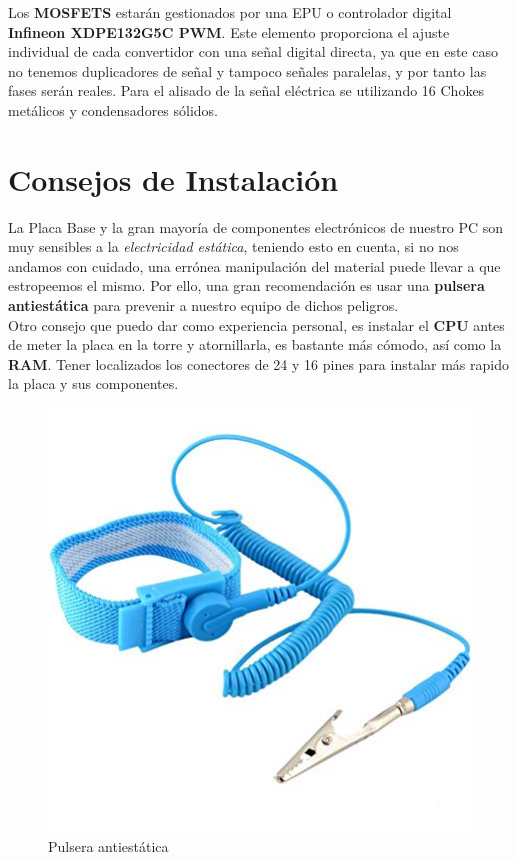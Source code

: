 \documentclass{article}
\begin{document}
      Los \textbf{MOSFETS} estarán gestionados por una EPU o controlador digital \textbf{Infineon XDPE132G5C PWM}. Este elemento proporciona el ajuste individual de cada convertidor con una señal digital directa, ya que en este caso no tenemos 
      duplicadores de señal y tampoco señales paralelas, y por tanto las fases serán reales. Para el alisado de la señal eléctrica se utilizando 16 Chokes metálicos y condensadores sólidos. 

  
      \section{Consejos de Instalación}
        La Placa Base y la gran mayoría de componentes electrónicos de nuestro PC son muy sensibles a la \textit{electricidad estática}, teniendo esto en cuenta, si no nos andamos con cuidado, una errónea manipulación del material
        puede llevar a que estropeemos el mismo. Por ello, una gran recomendación es usar una \textbf{pulsera antiestática} para prevenir a nuestro equipo de dichos peligros.
        \\
        Otro consejo que puedo dar como experiencia personal, es instalar el \textbf{CPU} antes de meter la placa en la torre y atornillarla, es bastante más cómodo, así como la \textbf{RAM}. Tener localizados los conectores de 24 y 16 pines para 
        instalar más rapido la placa y sus componentes.

        \begin{figure}[h]
            \centering
            \includegraphics[scale = 0.5]{img/pulsera.jpg}
            \caption{Pulsera antiestática}
        \end{figure}
    
\end{document}

